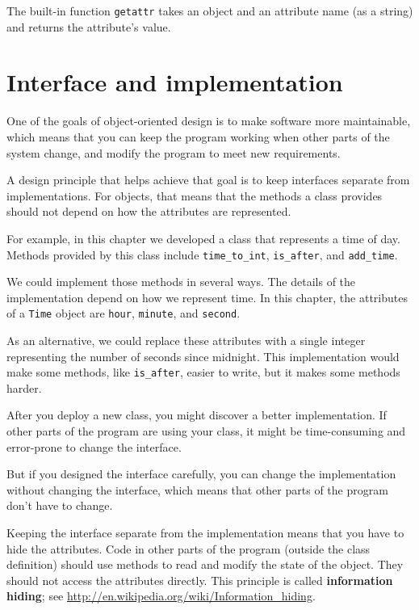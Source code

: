 \documentclass[10pt]{book}
\begin{document}
The built-in function {\tt getattr} takes an object and an attribute
name (as a string) and returns the attribute's value.


\section{Interface and implementation}

One of the goals of object-oriented design is to make software more
maintainable, which means that you can keep the program working when
other parts of the system change, and modify the program to meet new
requirements.

A design principle that helps achieve that goal is to keep
interfaces separate from implementations.  For objects, that means
that the methods a class provides should not depend on how the
attributes are represented.

For example, in this chapter we developed a class that represents
a time of day.  Methods provided by this class include
\verb"time_to_int", \verb"is_after", and \verb"add_time".

We could implement those methods in several ways.  The details of the
implementation depend on how we represent time.  In this chapter, the
attributes of a {\tt Time} object are {\tt hour}, {\tt minute}, and
{\tt second}.

As an alternative, we could replace these attributes with
a single integer representing the number of seconds
since midnight.  This implementation would make some methods,
like \verb"is_after", easier to write, but it makes some methods
harder.

After you deploy a new class, you might discover a better
implementation.  If other parts of the program are using your
class, it might be time-consuming and error-prone to change the
interface.  

But if you designed the interface carefully, you can
change the implementation without changing the interface, which
means that other parts of the program don't have to change.

Keeping the interface separate from the implementation means that
you have to hide the attributes.  Code in other parts of the program
(outside the class definition) should use methods to read
and modify the state of the object.  They should not access the
attributes directly.  This principle is called {\bf information hiding};
see \url{http://en.wikipedia.org/wiki/Information_hiding}.
\end{document}
